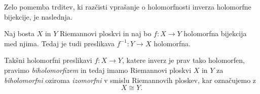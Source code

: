 \documentclass[mat1]{fmfdelo}
\numberwithin{equation}{section}
\newcommand{\C}{\mathbb C}
\newcommand{\RS}{\widehat{\C}}
\newcommand{\inv}{^{-1}}
\DeclareMathOperator{\id}{id}
\theoremstyle{definition}
\begin{document}
\begin{zgled*}

    
    

\end{zgled*}

Zelo pomemba trditev, ki razčisti vprašanje o  holomorfnosti inverza holomorfne bijekcije, je naslednja. 

\begin{trditev}
    \label{holomorfna bijekcija je biholomorfizem}
    Naj bosta $X$ in $Y$ Riemannovi ploskvi in naj bo $f: X \to Y$ holomorfna bijekcija med njima. Tedaj je tudi preslikava $f\inv : Y \to X$ holomorfna.
\end{trditev}

\begin{opomba}
    Takšni holomorfni preslikavi $f : X \to Y$, katere inverz je prav tako holomorfen, pravimo \emph{biholomorfizem} in tedaj imamo Riemannovi ploskvi $X$ in $Y$ za \emph{biholomorfni} oziroma \emph{izomorfni} v smislu Riemannovih ploskev, kar označujemo z 
    \[
        X \cong Y.
    \]
\end{opomba}
\end{document}
